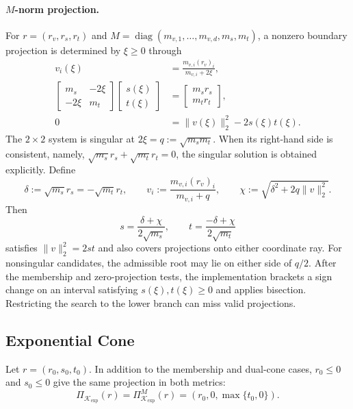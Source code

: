 \documentclass[letterpaper]{article} %
\theoremstyle{definition}
\theoremstyle{remark}
\begin{document}
\paragraph{\texorpdfstring{$M$}{M}-norm projection.}
For $r=(r_v,r_s,r_t)$ and
$M=\operatorname{diag}(m_{v,1},\ldots,m_{v,d},m_s,m_t)$, a nonzero boundary
projection is determined by $\xi\ge0$ through
\begin{equation}
\label{eq:rsoc-metric-projection}
\begin{aligned}
    v_i(\xi)
    &=\frac{m_{v,i}(r_v)_i}{m_{v,i}+2\xi},\\
    \begin{bmatrix}m_s&-2\xi\\-2\xi&m_t\end{bmatrix}
    \begin{bmatrix}s(\xi)\\t(\xi)\end{bmatrix}
    &=
    \begin{bmatrix}m_sr_s\\m_tr_t\end{bmatrix},\\
    0&=\|v(\xi)\|_2^2-2s(\xi)t(\xi).
\end{aligned}
\end{equation}
The $2\times2$ system is singular at
$2\xi=q:=\sqrt{m_sm_t}$.  When its right-hand side is consistent, namely,
$\sqrt{m_s}r_s+\sqrt{m_t}r_t=0$, the singular solution is obtained explicitly.
Define
\[
    \delta:=\sqrt{m_s}r_s=-\sqrt{m_t}r_t,
    \qquad
    v_i:=\frac{m_{v,i}(r_v)_i}{m_{v,i}+q},
    \qquad
    \chi:=\sqrt{\delta^2+2q\|v\|_2^2}.
\]
Then
\begin{equation}
\label{eq:rsoc-metric-singular-projection}
    s=\frac{\delta+\chi}{2\sqrt{m_s}},
    \qquad
    t=\frac{-\delta+\chi}{2\sqrt{m_t}}
\end{equation}
satisfies $\|v\|_2^2=2st$ and also covers projections onto either coordinate ray.
For nonsingular candidates, the admissible root may lie on either side of
$q/2$.  After the membership and zero-projection tests, the implementation
brackets a sign change on an interval satisfying $s(\xi),t(\xi)\ge0$ and
applies bisection. Restricting the search to the lower branch can miss valid
projections.

\subsection{Exponential Cone}

Let $r=(r_0,s_0,t_0)$. In addition to the membership and dual-cone cases,
$r_0\le0$ and $s_0\le0$ give the same projection in both metrics:
\[
    \Pi_{\mathcal K_{\mathrm{exp}}}(r)
    =\Pi_{\mathcal K_{\mathrm{exp}}}^{M}(r)
    =(r_0,0,\max\{t_0,0\}).
\]
\end{document}
